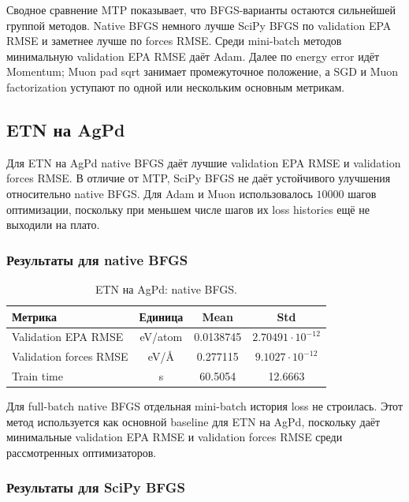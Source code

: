 Сводное сравнение MTP показывает, что BFGS-варианты остаются сильнейшей группой методов. Native BFGS немного лучше SciPy BFGS по validation EPA RMSE и заметнее лучше по forces RMSE. Среди mini-batch методов минимальную validation EPA RMSE даёт Adam. Далее по energy error идёт Momentum; Muon pad sqrt занимает промежуточное положение, а SGD и Muon factorization уступают по одной или нескольким основным метрикам.

\FloatBarrier

\subsection{ETN на AgPd}
\label{subsec:etn-agpd-results}

Для ETN на AgPd native BFGS даёт лучшие validation EPA RMSE и validation forces RMSE. В отличие от MTP, SciPy BFGS не даёт устойчивого улучшения относительно native BFGS. Для Adam и Muon использовалось \(10000\) шагов оптимизации, поскольку при меньшем числе шагов их loss histories ещё не выходили на плато.

\subsubsection{Результаты для native BFGS}

\begin{table}[H]
\centering
\small
\caption{ETN на AgPd: native BFGS.}
\label{tab:etn-agpd-native-bfgs}
\begin{tabular}{lccc}
\toprule
Метрика & Единица & Mean & Std \\
\midrule
Validation EPA RMSE & eV/atom & 0.0138745 & \(2.70491\cdot 10^{-12}\) \\
Validation forces RMSE & eV/\AA & 0.277115 & \(9.1027\cdot 10^{-12}\) \\
Train time & s & 60.5054 & 12.6663 \\
\bottomrule
\end{tabular}
\end{table}

Для full-batch native BFGS отдельная mini-batch история loss не строилась. Этот метод используется как основной baseline для ETN на AgPd, поскольку даёт минимальные validation EPA RMSE и validation forces RMSE среди рассмотренных оптимизаторов.

\FloatBarrier

\subsubsection{Результаты для SciPy BFGS}

